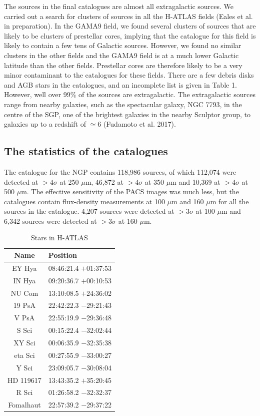 \documentclass[useAMS,usenatbib]{mn2e}
\begin{document}
The sources in the final catalogues are almost all extragalactic sources. We carried out
a search for clusters of sources in all the H-ATLAS fields (Eales et al. in preparation).
In the GAMA9 field, we found several clusters of sources that are likely to
be clusters of prestellar cores, implying 
that the catalogue for this field
is likely to contain a few tens of Galactic sources.
However, we found no similar clusters in the other fields and the
GAMA9 field is at a much lower Galactic latitude than the other
fields. Prestellar cores are therefore likely to be a very minor contaminant to the
catalogues for these fields. There are a few debris disks and AGB stars
in the catalogues, 
and an incomplete list is given in Table 1.
However, well over 99\% of the sources are extragalactic. The extragalactic
sources range from nearby galaxies, such as the spectacular galaxy, NGC 7793,
in the centre of the SGP, one of the brightest
galaxies in the nearby Sculptor group, to galaxies up to a redshift of $\simeq$6 (Fudamoto
et al. 2017).

\subsection{The statistics of the catalogues}

The catalogue for the NGP contains 118,986 sources, of which 112,074 were detected
at $>4\sigma$ at 250 $\mu$m, 46,872 at $>4\sigma$ at 350 $\mu$m and 10,369 at
$>4\sigma$ at 500 $\mu$m. The effective sensitivity of the PACS images was
much less, but the catalogues contain flux-density measurements at 100 $\mu$m and
160 $\mu$m for all the sources in the catalogue. 4,207  sources were detected
at $>3\sigma$ at 100 $\mu$m and 6,342 sources were detected at 
$>3\sigma$ at 160 $\mu$m.


\begin{table}
\caption{Stars in H-ATLAS}
\begin{tabular}{cl}
\hline
Name & Position \\
\hline
EY Hya & 08:46:21.4 $+$01:37:53 \\
IN Hya & 09:20:36.7 $+$00:10:53 \\
NU Com & 13:10:08.5 $+$24:36:02 \\
19 PsA & 22:42:22.3 $-$29:21:43 \\
V PsA & 22:55:19.9  $-$29:36:48 \\
S Sci & 00:15:22.4 $-$32:02:44 \\
XY Sci & 00:06:35.9 $-$32:35:38 \\
eta Sci & 00:27:55.9 $-$33:00:27 \\
Y Sci & 23:09:05.7 $-$30:08:04 \\
HD 119617 & 13:43:35.2 $+$35:20:45 \\
R Sci & 01:26:58.2 $-$32:32:37 \\
Fomalhaut & 22:57:39.2 $-$29:37:22 \\
\hline
\end{tabular}
\end{table}
\end{document}
